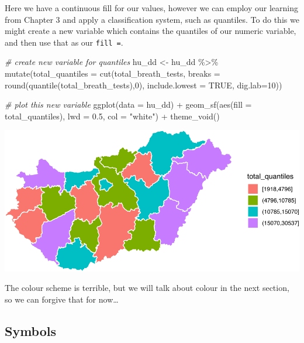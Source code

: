 \documentclass[
  krantz2]{krantz}
\makeatletter
\newenvironment{Shaded}{\begin{snugshade}}{\end{snugshade}}
\newcommand{\AttributeTok}[1]{\textcolor[rgb]{0.61,0.61,0.61}{#1}}
\newcommand{\CommentTok}[1]{\textcolor[rgb]{0.37,0.37,0.37}{\textit{#1}}}
\newcommand{\ConstantTok}[1]{\textcolor[rgb]{0,0,0}{#1}}
\newcommand{\DecValTok}[1]{\textcolor[rgb]{0.06,0.06,0.06}{#1}}
\newcommand{\FloatTok}[1]{\textcolor[rgb]{0.06,0.06,0.06}{#1}}
\newcommand{\FunctionTok}[1]{\textcolor[rgb]{0,0,0}{#1}}
\newcommand{\NormalTok}[1]{#1}
\newcommand{\OtherTok}[1]{\textcolor[rgb]{0.37,0.37,0.37}{#1}}
\newcommand{\SpecialCharTok}[1]{\textcolor[rgb]{0,0,0}{#1}}
\newcommand{\StringTok}[1]{\textcolor[rgb]{0.5,0.5,0.5}{#1}}
\newenvironment{kframe}{%
\medskip{}
\setlength{\fboxsep}{.8em}
 \def\at@end@of@kframe{}%
 \ifinner\ifhmode%
  \def\at@end@of@kframe{\end{minipage}}%
  \begin{minipage}{\columnwidth}%
 \fi\fi%
 \def\FrameCommand##1{\hskip\@totalleftmargin \hskip-\fboxsep
 \colorbox{shadecolor}{##1}\hskip-\fboxsep
     \hskip-\linewidth \hskip-\@totalleftmargin \hskip\columnwidth}%
 \MakeFramed {\advance\hsize-\width
   \@totalleftmargin\z@ \linewidth\hsize
   \@setminipage}}%
 {\par\unskip\endMakeFramed%
 \at@end@of@kframe}
\renewenvironment{Shaded}{\begin{kframe}}{\end{kframe}}
\makeatother
\begin{document}
Here we have a continuous fill for our values, however we can employ our learning from Chapter 3 and apply a classification system, such as quantiles. To do this we might create a new variable which contains the quantiles of our numeric variable, and then use that as our \texttt{fill\ =}.

\begin{Shaded}
\begin{Highlighting}[]
\CommentTok{\# create new variable for quantiles}
\NormalTok{hu\_dd }\OtherTok{\textless{}{-}}\NormalTok{ hu\_dd }\SpecialCharTok{\%\textgreater{}\%} 
  \FunctionTok{mutate}\NormalTok{(}\AttributeTok{total\_quantiles =} \FunctionTok{cut}\NormalTok{(total\_breath\_tests, }\AttributeTok{breaks =} \FunctionTok{round}\NormalTok{(}\FunctionTok{quantile}\NormalTok{(total\_breath\_tests),}\DecValTok{0}\NormalTok{), }\AttributeTok{include.lowest =} \ConstantTok{TRUE}\NormalTok{, }\AttributeTok{dig.lab=}\DecValTok{10}\NormalTok{))}

\CommentTok{\# plot this new variable}
\FunctionTok{ggplot}\NormalTok{(}\AttributeTok{data =}\NormalTok{ hu\_dd) }\SpecialCharTok{+} 
  \FunctionTok{geom\_sf}\NormalTok{(}\FunctionTok{aes}\NormalTok{(}\AttributeTok{fill =}\NormalTok{ total\_quantiles), }
          \AttributeTok{lwd =} \FloatTok{0.5}\NormalTok{, }
          \AttributeTok{col =} \StringTok{"white"}\NormalTok{) }\SpecialCharTok{+} 
  \FunctionTok{theme\_void}\NormalTok{()}
\end{Highlighting}
\end{Shaded}

\includegraphics{crime_mapping_files/figure-latex/unnamed-chunk-153-1.pdf}

The colour scheme is terrible, but we will talk about colour in the next section, so we can forgive that for now\ldots{}

\hypertarget{symbols}{%
\subsection{Symbols}\label{symbols}}
\end{document}
